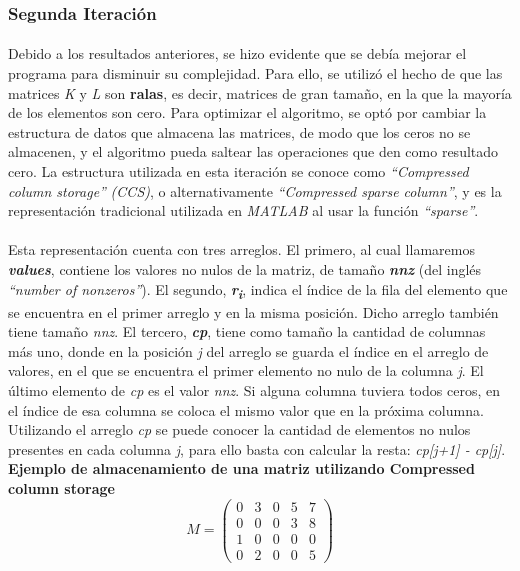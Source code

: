 \documentclass[a4paper,11pt]{article}
\begin{document}
\subsubsection{Segunda Iteraci\'on}
\paragraph{}
Debido a los resultados anteriores, se hizo evidente que se deb\'ia mejorar el programa para disminuir su complejidad. Para ello, se utiliz\'o el hecho de que las matrices \emph{K} y \emph{L} son \textbf{ralas}, es decir, matrices de gran tamaño, en la que la mayor\'ia de los elementos son cero. Para optimizar el algoritmo, se opt\'o por cambiar la estructura de datos que almacena las matrices, de modo que los ceros no se almacenen, y el algoritmo pueda saltear las operaciones que den como resultado cero. La estructura utilizada en esta iteraci\'on se conoce como \emph{``Compressed column storage''} \emph{(CCS)}, o alternativamente \emph{``Compressed sparse column''}, y es la representaci\'on tradicional utilizada en \emph{MATLAB} al usar la funci\'on \emph{``sparse''}. 
\paragraph{}
Esta representaci\'on cuenta con tres arreglos. El primero, al cual llamaremos \textbf{\emph{values}}, contiene los valores no nulos de la matriz, de tamaño \textbf{\emph{nnz}} (del ingl\'es \emph{``number of nonzeros''}). El segundo, \textbf{\emph{r\textsubscript{i}}}, indica el \'indice de la fila del elemento que se encuentra en el primer arreglo y en la misma posici\'on. Dicho arreglo tambi\'en tiene tamaño \emph{nnz}. El tercero, \textbf{\emph{cp}}, tiene como tamaño la cantidad de columnas m\'as uno, donde en la posici\'on \emph{j} del arreglo se guarda el \'indice en el arreglo de valores, en el que se encuentra el primer elemento no nulo de la columna \emph{j}. El \'ultimo elemento de \emph{cp} es el valor \emph{nnz}. Si alguna columna tuviera todos ceros, en el \'indice de esa columna se coloca el mismo valor que en la pr\'oxima columna. Utilizando el arreglo \emph{cp} se puede conocer la cantidad de elementos no nulos presentes en cada columna \emph{j}, para ello basta con calcular la resta: \emph{cp[j+1] - cp[j]}.\\

\textbf{Ejemplo de almacenamiento de una matriz utilizando Compressed column storage}\\
\[ M = \left( \begin{array}{ccccc}
0 & 3 & 0 & 5 & 7 \\
0 & 0 & 0 & 3 & 8 \\
1 & 0 & 0 & 0 & 0 \\
0 & 2 & 0 & 0 & 5\end{array} \right)\] 
\end{document}
